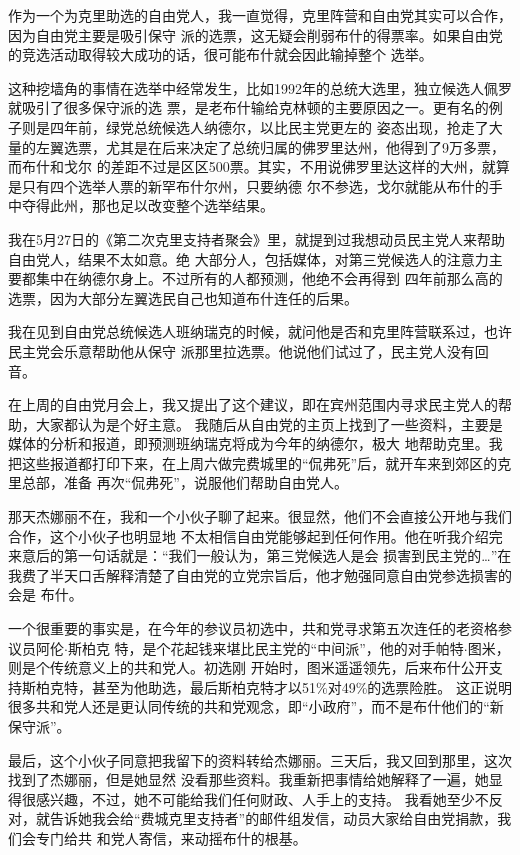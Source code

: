 ﻿\documentclass[11pt]{article}
\begin{document}
作为一个为克里助选的自由党人，我一直觉得，克里阵营和自由党其实可以合作，因为自由党主要是吸引保守
派的选票，这无疑会削弱布什的得票率。如果自由党的竞选活动取得较大成功的话，很可能布什就会因此输掉整个
选举。

这种挖墙角的事情在选举中经常发生，比如1992年的总统大选里，独立候选人佩罗就吸引了很多保守派的选
票，是老布什输给克林顿的主要原因之一。更有名的例子则是四年前，绿党总统候选人纳德尔，以比民主党更左的
姿态出现，抢走了大量的左翼选票，尤其是在后来决定了总统归属的佛罗里达州，他得到了9万多票，而布什和戈尔
的差距不过是区区500票。其实，不用说佛罗里达这样的大州，就算是只有四个选举人票的新罕布什尔州，只要纳德
尔不参选，戈尔就能从布什的手中夺得此州，那也足以改变整个选举结果。

我在5月27日的《第二次克里支持者聚会》里，就提到过我想动员民主党人来帮助自由党人，结果不太如意。绝
大部分人，包括媒体，对第三党候选人的注意力主要都集中在纳德尔身上。不过所有的人都预测，他绝不会再得到
四年前那么高的选票，因为大部分左翼选民自己也知道布什连任的后果。

我在见到自由党总统候选人班纳瑞克的时候，就问他是否和克里阵营联系过，也许民主党会乐意帮助他从保守
派那里拉选票。他说他们试过了，民主党人没有回音。

在上周的自由党月会上，我又提出了这个建议，即在宾州范围内寻求民主党人的帮助，大家都认为是个好主意。
我随后从自由党的主页上找到了一些资料，主要是媒体的分析和报道，即预测班纳瑞克将成为今年的纳德尔，极大
地帮助克里。我把这些报道都打印下来，在上周六做完费城里的``侃弗死''后，就开车来到郊区的克里总部，准备
再次``侃弗死''，说服他们帮助自由党人。

那天杰娜丽不在，我和一个小伙子聊了起来。很显然，他们不会直接公开地与我们合作，这个小伙子也明显地
不太相信自由党能够起到任何作用。他在听我介绍完来意后的第一句话就是：``我们一般认为，第三党候选人是会
损害到民主党的\ldots ''在我费了半天口舌解释清楚了自由党的立党宗旨后，他才勉强同意自由党参选损害的会是
布什。

一个很重要的事实是，在今年的参议员初选中，共和党寻求第五次连任的老资格参议员阿伦$\cdot$斯柏克
特，是个花起钱来堪比民主党的``中间派''，他的对手帕特$\cdot$图米，则是个传统意义上的共和党人。初选刚
开始时，图米遥遥领先，后来布什公开支持斯柏克特，甚至为他助选，最后斯柏克特才以51\%对49\%的选票险胜。
这正说明很多共和党人还是更认同传统的共和党观念，即``小政府''，而不是布什他们的``新保守派''。

最后，这个小伙子同意把我留下的资料转给杰娜丽。三天后，我又回到那里，这次找到了杰娜丽，但是她显然
没看那些资料。我重新把事情给她解释了一遍，她显得很感兴趣，不过，她不可能给我们任何财政、人手上的支持。
我看她至少不反对，就告诉她我会给``费城克里支持者''的邮件组发信，动员大家给自由党捐款，我们会专门给共
和党人寄信，来动摇布什的根基。
\end{document}
